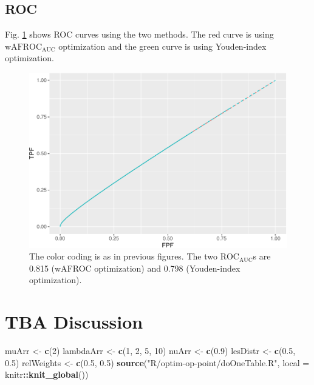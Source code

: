 \documentclass[
]{book}
\newenvironment{Shaded}{\begin{snugshade}}{\end{snugshade}}
\newcommand{\DataTypeTok}[1]{\textcolor[rgb]{0.13,0.29,0.53}{#1}}
\newcommand{\DecValTok}[1]{\textcolor[rgb]{0.00,0.00,0.81}{#1}}
\newcommand{\FloatTok}[1]{\textcolor[rgb]{0.00,0.00,0.81}{#1}}
\newcommand{\KeywordTok}[1]{\textcolor[rgb]{0.13,0.29,0.53}{\textbf{#1}}}
\newcommand{\NormalTok}[1]{#1}
\newcommand{\OperatorTok}[1]{\textcolor[rgb]{0.81,0.36,0.00}{\textbf{#1}}}
\newcommand{\StringTok}[1]{\textcolor[rgb]{0.31,0.60,0.02}{#1}}
\begin{document}
\hypertarget{roc-2}{%
\subsection{ROC}\label{roc-2}}

Fig. \ref{fig:optim-op-point-application-roc} shows ROC curves using the two methods. The red curve is using \(\text{wAFROC}_\text{AUC}\) optimization and the green curve is using Youden-index optimization.

\begin{figure}
\centering
\includegraphics{21-optim-op-point_files/figure-latex/optim-op-point-application-roc-1.pdf}
\caption{\label{fig:optim-op-point-application-roc}The color coding is as in previous figures. The two \(\text{ROC}_\text{AUC}\)s are 0.815 (wAFROC optimization) and 0.798 (Youden-index optimization).}
\end{figure}

\hypertarget{optim-op-point-discussion}{%
\section{TBA Discussion}\label{optim-op-point-discussion}}

\begin{Shaded}
\begin{Highlighting}[]
\NormalTok{muArr <-}\StringTok{ }\KeywordTok{c}\NormalTok{(}\DecValTok{2}\NormalTok{)}
\NormalTok{lambdaArr <-}\StringTok{ }\KeywordTok{c}\NormalTok{(}\DecValTok{1}\NormalTok{, }\DecValTok{2}\NormalTok{, }\DecValTok{5}\NormalTok{, }\DecValTok{10}\NormalTok{)}
\NormalTok{nuArr <-}\StringTok{ }\KeywordTok{c}\NormalTok{(}\FloatTok{0.9}\NormalTok{)}
\NormalTok{lesDistr <-}\StringTok{ }\KeywordTok{c}\NormalTok{(}\FloatTok{0.5}\NormalTok{, }\FloatTok{0.5}\NormalTok{)}
\NormalTok{relWeights <-}\StringTok{ }\KeywordTok{c}\NormalTok{(}\FloatTok{0.5}\NormalTok{, }\FloatTok{0.5}\NormalTok{)}
\KeywordTok{source}\NormalTok{(}\StringTok{"R/optim-op-point/doOneTable.R"}\NormalTok{, }\DataTypeTok{local =}\NormalTok{ knitr}\OperatorTok{::}\KeywordTok{knit_global}\NormalTok{())}
\end{Highlighting}
\end{Shaded}
\end{document}

